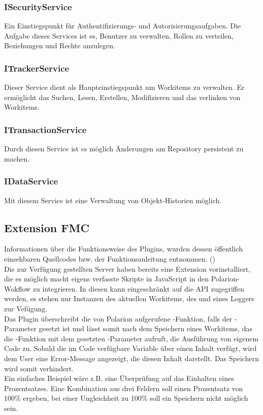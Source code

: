 \subsubsection{ISecurityService}
Ein Einstiegspunkt für Authentifizierungs- und Autorisierungsaufgaben. Die Aufgabe dieses Services ist es, Benutzer zu verwalten, Rollen zu verteilen, Beziehungen und Rechte anzulegen.
\subsubsection{ITrackerService}
Dieser Service dient als Haupteinstiegspunkt um Workitems zu verwalten. Er ermöglicht das Suchen, Lesen, Erstellen, Modifizieren und das verlinken von Workitems.
\subsubsection{ITransactionService}
Durch diesen Service ist es möglich Änderungen am Repository persistent zu machen. 
\subsubsection{IDataService}
Mit diesem Service ist eine Verwaltung von Objekt-Historien möglich.
\subsection{Extension FMC}
\label{sub:fmc}
Informationen über die Funktionsweise des Plugins, wurden dessen öffentlich einsehbaren Quellcodes bzw. der Funktionsanleitung entnommen. (\cite{8})\\
Die zur Verfügung gestellten Server haben bereits eine Extension vorinstalliert, die es möglich macht eigens verfasste Skripte in JavaScript in den Polarion-Wokflow zu integrieren. In diesen kann eingeschränkt auf die API zugegriffen werden, es stehen nur Instanzen des aktuellen Workitems, des  und eines Loggers zur Vefügung.\\
Das Plugin überschreibt die von Polarion aufgerufene -Funktion, falls der -Parameter gesetzt ist und lässt somit nach dem Speichern eines Workitems, das die -Funktion mit dem gesetzten -Parameter aufruft, die Ausführung von eigenem Code zu. Sobald die im Code verfügbare Variable  über einen Inhalt verfügt, wird dem User eine Error-Message angezeigt, die diesen Inhalt darstellt. Das Speichern wird somit verhindert. \\
Ein einfaches Beispiel wäre z.B. eine Überprüfung auf das Einhalten eines Prozentsatzes. Eine Kombination aus drei Feldern soll einen Prozentsatz von 100\% ergeben, bei einer Ungleichheit zu 100\% soll ein Speichern nicht möglich sein.
